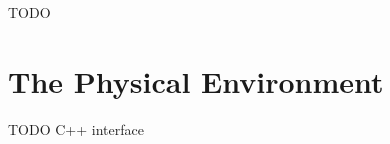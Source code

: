 \ifdraft TODO

\chapter{The Physical Environment}
\label{cha:environment}

TODO C++ interface

\fi



